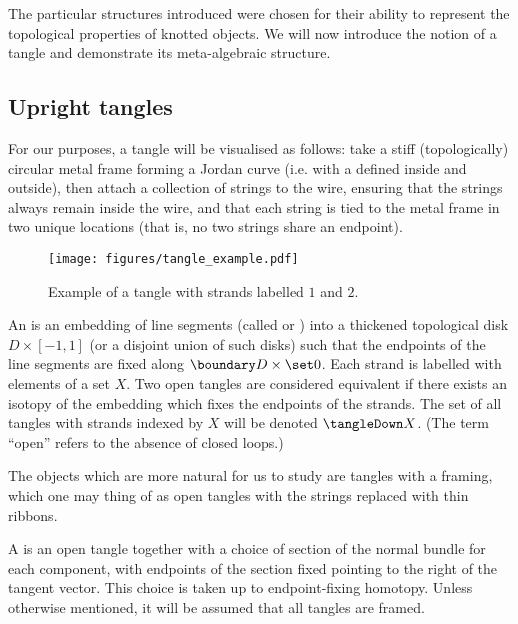 The particular structures introduced were chosen for their ability to represent
the topological properties of knotted objects. We will now introduce the notion
of a tangle and demonstrate its meta-algebraic structure.

\subsection{Upright tangles}

For our purposes, a tangle will be visualised as follows: take a stiff
(topologically) circular metal frame forming a Jordan curve (i.e. with a defined
inside and outside), then attach a collection of strings to the wire, ensuring
that the strings always remain inside the wire, and that each string is tied to
the metal frame in two unique locations (that is, no two strings share an
endpoint).
\begin{figure}[h]
        \centering
        \texttt{[image: figures/tangle\_example.pdf]}
        \caption{Example of a tangle with strands labelled $1$ and $2$.}
        \label{fig:tangle_example}
\end{figure}

\begin{definition}
        An  is an embedding of line segments (called
         or ) into a thickened topological disk
        $D \times [-1,1]$ (or a disjoint union of such disks) such that the
        endpoints of the line segments are fixed along
        $\boundary D \times \set0$. Each strand is labelled with elements of a
        set $X$. Two open tangles are considered equivalent if there exists an
        isotopy of the embedding which fixes the endpoints of the strands. The
        set of all tangles with strands indexed by $X$ will be denoted
        $\tangleDown X$. (The term \enquote{open} refers to the absence of
        closed loops.)
\end{definition}

The objects which are more natural for us to study are tangles with a framing,
which one may thing of as open tangles with the strings replaced with thin
ribbons.

\begin{definition}
        A  is an open tangle together with a choice of
        section of the normal bundle for each component, with endpoints of the
        section fixed pointing to the right of the tangent vector. This choice
        is taken up to endpoint-fixing homotopy. Unless otherwise mentioned, it
        will be assumed that all tangles are framed.
\end{definition}

